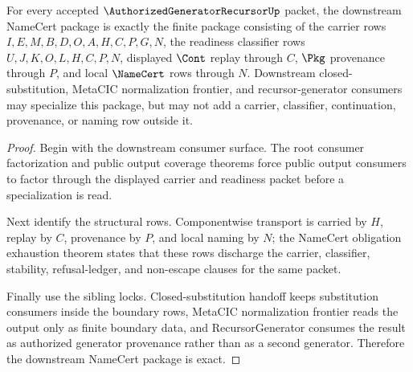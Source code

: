 \begin{theorem}
\label{thm:authorized-generator-recursor-downstream-namecert-package}
For every accepted $\AuthorizedGeneratorRecursorUp$ packet, the downstream NameCert package is exactly the finite package consisting of the carrier rows $I,E,M,B,D,O,A,H,C,P,G,N$, the readiness classifier rows $U,J,K,O,L,H,C,P,N$, displayed $\Cont$ replay through $C$, $\Pkg$ provenance through $P$, and local $\NameCert$ rows through $N$. Downstream closed-substitution, MetaCIC normalization frontier, and recursor-generator consumers may specialize this package, but may not add a carrier, classifier, continuation, provenance, or naming row outside it.
\end{theorem}
\begin{proof}
Begin with the downstream consumer surface. The root consumer factorization and public output coverage theorems force public output consumers to factor through the displayed carrier and readiness packet before a specialization is read.

Next identify the structural rows. Componentwise transport is carried by $H$, replay by $C$, provenance by $P$, and local naming by $N$; the NameCert obligation exhaustion theorem states that these rows discharge the carrier, classifier, stability, refusal-ledger, and non-escape clauses for the same packet.

Finally use the sibling locks. Closed-substitution handoff keeps substitution consumers inside the boundary rows, MetaCIC normalization frontier reads the output only as finite boundary data, and RecursorGenerator consumes the result as authorized generator provenance rather than as a second generator. Therefore the downstream NameCert package is exact.
\end{proof}

